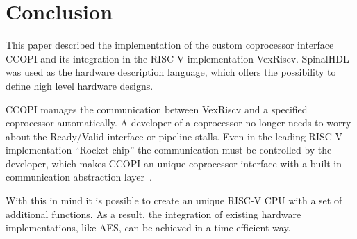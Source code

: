 \documentclass[twoside,twocolumn]{article}
\begin{document}
\section{Conclusion}
This paper described the implementation of the custom coprocessor
interface CCOPI and its integration in the RISC-V implementation
VexRiscv. SpinalHDL was used as the hardware description language,
which offers the possibility to define high level hardware designs.

CCOPI manages the communication between VexRiscv and a specified
coprocessor automatically. A developer of a coprocessor no longer needs
to worry about the Ready/Valid interface or pipeline stalls. Even in the
leading RISC-V implementation ``Rocket chip'' the communication must be
controlled by the developer,
which makes CCOPI an unique coprocessor interface with a built-in
communication abstraction layer~\cite{rocket-chip_rocc}.

With this in mind it is possible to create an unique
RISC-V CPU with a set of additional functions. As a result, the integration of
existing hardware implementations, like AES, can be achieved in a 
time-efficient way. 



\end{document}

